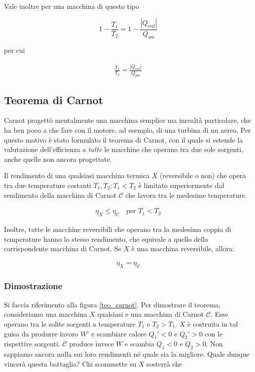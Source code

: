 Vale inoltre per una macchina di questo tipo

\[ 1 - \frac{T_1}{T_2} = 1 - \frac{|Q_\text{ced}|}{Q_\text{ass}} \]

\noindent per cui

\begin{align}
    \frac{T_1}{T_2} = \frac{|Q_\text{ced}|}{Q_\text{ass}}
\end{align}



\subsection{Teorema di Carnot}
Carnot progettò mentalmente una macchina semplice ma inrealtà
particolare, che ha ben poco a che fare con il motore, ad esempio,
di una turbina di un aereo. Per questo motivo è stato formulato
il teorema di Carnot, con il quale si estende la valutazione
dell'efficienza a \textit{tutte} le macchine che operano tra due
sole sorgenti, anche quelle non ancora progettate.


\begin{tcolorbox}[colback = red!30, colframe = red!30!black, title = {Teorema di Carnot}]
Il rendimento di una qualsiasi macchina termica $X$ (reversibile o non)
che opera tra due
temperature costanti $T_1,T_2: T_1 < T_2$ è limitato superiormente dal rendimento della
macchina di Carnot $\mathcal{C}$ che lavora tra le medesime temperature.

\begin{align}
    \eta_X \leq \eta_\mathcal{C} \quad \text{per } T_1 < T_2\label{carnot1}
\end{align}

Inoltre, tutte le macchine reversibili che operano tra la medesima coppia di temperature
hanno lo stesso rendimento, che equivale a quello della corrispondente macchina di
Carnot. Se $X$ è una macchina reversibile, allora:

\begin{align}
    \eta_X = \eta_\mathcal{C}\label{carnot2}
\end{align}

\end{tcolorbox}


\subsubsection*{Dimostrazione}
Si faccia riferimento alla figura \ref{teo_carnot}.
Per dimostrare il teorema, consideriamo una macchina $X$ qualsiasi
e una macchina di Carnot $\mathcal{C}$. Esse operano tra le solite
sorgenti a temperature $T_1$ e $T_2 > T_1$.
$X$ è costruita in tal guisa da produrre lavoro $W'$ e scambiare
calore $Q_1' < 0$ e $Q_2' > 0$ con le rispettive sorgenti. $\mathcal{C}$
produce invece $W$ e scambia $Q_1 < 0$ e $Q_2 > 0$.
Non sappiamo ancora nulla sui loro rendimenti né quale sia la migliore.
Quale dunque vincerà questa battaglia?
Chi scommette su $X$ sosterrà che

